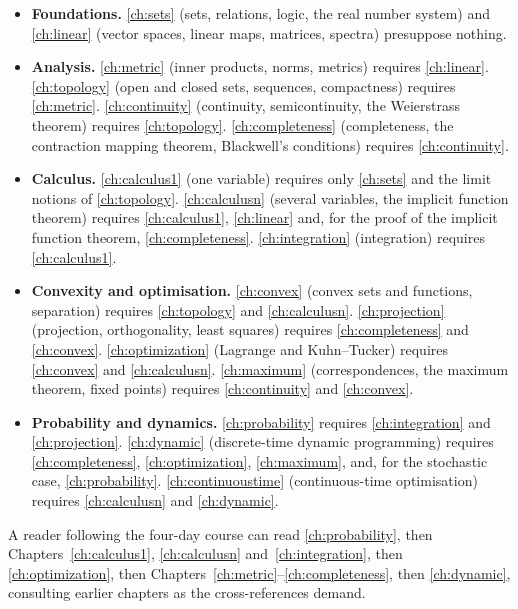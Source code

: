 \begin{itemize}
	\item \textbf{Foundations.} \autoref{ch:sets} (sets, relations, logic, the real
	      number system) and \autoref{ch:linear} (vector spaces, linear maps,
	      matrices, spectra) presuppose nothing.
	\item \textbf{Analysis.} \autoref{ch:metric} (inner products, norms, metrics)
	      requires \autoref{ch:linear}. \autoref{ch:topology} (open and closed sets,
	      sequences, compactness) requires \autoref{ch:metric}.
	      \autoref{ch:continuity} (continuity, semicontinuity, the Weierstrass
	      theorem) requires \autoref{ch:topology}. \autoref{ch:completeness}
	      (completeness, the contraction mapping theorem, Blackwell's conditions)
	      requires \autoref{ch:continuity}.
	\item \textbf{Calculus.} \autoref{ch:calculus1} (one variable) requires only
	      \autoref{ch:sets} and the limit notions of \autoref{ch:topology}.
	      \autoref{ch:calculusn} (several variables, the implicit function theorem)
	      requires \autoref{ch:calculus1}, \autoref{ch:linear} and, for the proof of
	      the implicit function theorem, \autoref{ch:completeness}.
	      \autoref{ch:integration} (integration) requires \autoref{ch:calculus1}.
	\item \textbf{Convexity and optimisation.} \autoref{ch:convex} (convex sets and
	      functions, separation) requires \autoref{ch:topology} and
	      \autoref{ch:calculusn}. \autoref{ch:projection} (projection, orthogonality,
	      least squares) requires \autoref{ch:completeness} and \autoref{ch:convex}.
	      \autoref{ch:optimization} (Lagrange and Kuhn--Tucker) requires
	      \autoref{ch:convex} and \autoref{ch:calculusn}. \autoref{ch:maximum}
	      (correspondences, the maximum theorem, fixed points) requires
	      \autoref{ch:continuity} and \autoref{ch:convex}.
	\item \textbf{Probability and dynamics.} \autoref{ch:probability} requires
	      \autoref{ch:integration} and \autoref{ch:projection}.
	      \autoref{ch:dynamic} (discrete-time dynamic programming) requires
	      \autoref{ch:completeness}, \autoref{ch:optimization}, \autoref{ch:maximum},
	      and, for the stochastic case, \autoref{ch:probability}.
	      \autoref{ch:continuoustime} (continuous-time optimisation) requires
	      \autoref{ch:calculusn} and \autoref{ch:dynamic}.
\end{itemize}

A reader following the four-day course can read
\autoref{ch:probability}, then Chapters~\ref{ch:calculus1},
\ref{ch:calculusn} and~\ref{ch:integration}, then \autoref{ch:optimization},
then Chapters~\ref{ch:metric}--\ref{ch:completeness}, then
\autoref{ch:dynamic}, consulting earlier chapters as the cross-references
demand.

